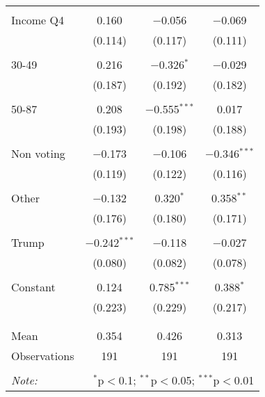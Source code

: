 \begin{tabular}{@{\extracolsep{5pt}}lccc}
  & & & \\ 
 Income Q4 & 0.160 & $-$0.056 & $-$0.069 \\ 
  & (0.114) & (0.117) & (0.111) \\ 
  & & & \\ 
 30-49 & 0.216 & $-$0.326$^{*}$ & $-$0.029 \\ 
  & (0.187) & (0.192) & (0.182) \\ 
  & & & \\ 
 50-87 & 0.208 & $-$0.555$^{***}$ & 0.017 \\ 
  & (0.193) & (0.198) & (0.188) \\ 
  & & & \\ 
 Non voting & $-$0.173 & $-$0.106 & $-$0.346$^{***}$ \\ 
  & (0.119) & (0.122) & (0.116) \\ 
  & & & \\ 
 Other & $-$0.132 & 0.320$^{*}$ & 0.358$^{**}$ \\ 
  & (0.176) & (0.180) & (0.171) \\ 
  & & & \\ 
 Trump & $-$0.242$^{***}$ & $-$0.118 & $-$0.027 \\ 
  & (0.080) & (0.082) & (0.078) \\ 
  & & & \\ 
 Constant & 0.124 & 0.785$^{***}$ & 0.388$^{*}$ \\ 
  & (0.223) & (0.229) & (0.217) \\ 
  & & & \\ 
\hline \\[-1.8ex] 
Mean & 0.354 & 0.426 & 0.313 \\ 
Observations & 191 & 191 & 191 \\ 
\hline 
\hline \\[-1.8ex] 
\textit{Note:}  & \multicolumn{3}{r}{$^{*}$p$<$0.1; $^{**}$p$<$0.05; $^{***}$p$<$0.01} \\ 
\end{tabular} 
